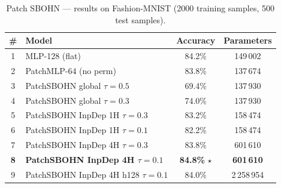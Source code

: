 \begin{table}[h]
\centering
\caption{Patch SBOHN --- results on Fashion-MNIST (2000 training samples, 500 test samples).}
\begin{tabular}{clcc}
\hline
\# & \textbf{Model} & \textbf{Accuracy} & \textbf{Parameters} \\
\hline
1 & MLP-128 (flat) & 84.2\% & 149\,002 \\
2 & PatchMLP-64 (no perm) & 83.8\% & 137\,674 \\
3 & PatchSBOHN global $\tau{=}0.5$ & 69.4\% & 137\,930 \\
4 & PatchSBOHN global $\tau{=}0.3$ & 74.0\% & 137\,930 \\
5 & PatchSBOHN InpDep 1H $\tau{=}0.3$ & 83.2\% & 158\,474 \\
6 & PatchSBOHN InpDep 1H $\tau{=}0.1$ & 82.2\% & 158\,474 \\
7 & PatchSBOHN InpDep 4H $\tau{=}0.3$ & 83.8\% & 601\,610 \\
\textbf{8} & \textbf{PatchSBOHN InpDep 4H $\tau{=}0.1$} & \textbf{84.8\%} $\star$ & \textbf{601\,610} \\
9 & PatchSBOHN InpDep 4H h128 $\tau{=}0.1$ & 84.0\% & 2\,258\,954 \\
\hline
\end{tabular}
\end{table}
